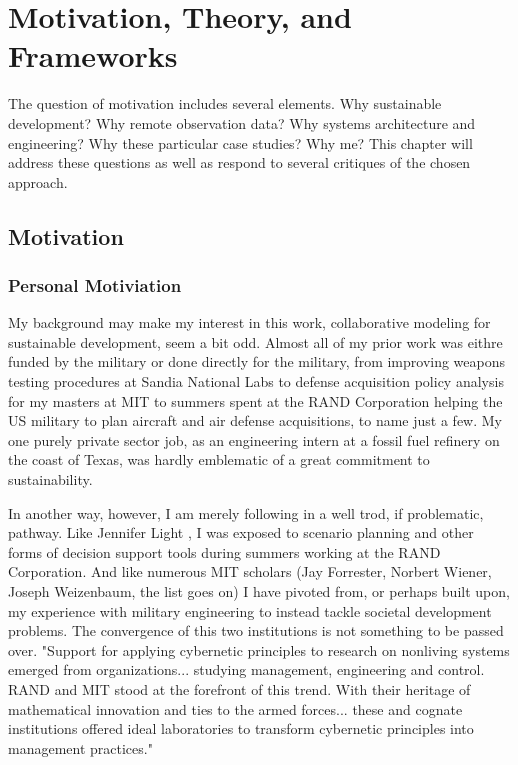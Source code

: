 \chapter{Motivation, Theory, and Frameworks}

The question of motivation includes several elements. Why sustainable development? Why remote observation data? Why systems architecture and engineering? Why these particular case studies? Why me? This chapter will address these questions as well as respond to several critiques of the chosen approach.

\section{Motivation}

\subsection{Personal Motiviation}

My background may make my interest in this work, collaborative modeling for sustainable development, seem a bit odd. Almost all of my prior work was eithre funded by the military or done directly for the military, from improving weapons testing procedures at Sandia National Labs to defense acquisition policy analysis for my masters at MIT to summers spent at the RAND Corporation helping the US military to plan aircraft and air defense acquisitions, to name just a few. My one purely private sector job, as an engineering intern at a fossil fuel refinery on the coast of Texas, was hardly emblematic of a great commitment to sustainability.

In another way, however, I am merely following in a well trod, if problematic, pathway. Like Jennifer Light \cite{lightWarfareWelfareDefense2005}, I was exposed to scenario planning and other forms of decision support tools during summers working at the RAND Corporation. And like numerous MIT scholars (Jay Forrester, Norbert Wiener, Joseph Weizenbaum, the list goes on) I have pivoted from, or perhaps built upon, my experience with military engineering to instead tackle societal development problems. The convergence of this two institutions is not something to be passed over. "Support for applying cybernetic principles to research on nonliving systems emerged from organizations... studying management, engineering and control. RAND and MIT stood at the forefront of this trend. With their heritage of mathematical innovation and ties to the armed forces... these and cognate institutions offered ideal laboratories to transform cybernetic principles into management practices." \cite{lightWarfareWelfareDefense2005} 


